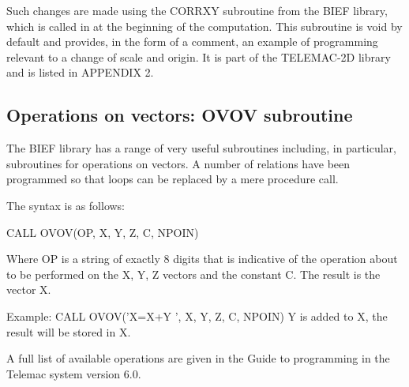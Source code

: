  Such changes are made using the CORRXY subroutine from the BIEF library, which is called in at the beginning of the computation. This subroutine is void by default and provides, in the form of a comment, an example of programming relevant to a change of scale and origin. It is part of the TELEMAC-2D library and is listed in APPENDIX 2.


\subsection{ Operations on vectors: OVOV subroutine }

 The BIEF library has a range of very useful subroutines including, in particular, subroutines for operations on vectors. A number of relations have been programmed so that loops can be replaced by a mere procedure call.

 The syntax is as follows:

 CALL OVOV(OP, X, Y, Z, C, NPOIN)

 Where OP is a string of exactly 8 digits that is indicative of the operation about to be performed on the X, Y, Z vectors and the constant C. The result is the vector X.

 Example:  CALL OVOV('X=X+Y ', X, Y, Z, C, NPOIN)  Y is added to X, the result will be stored in X.

 A full list of available operations are given in the Guide to programming in the Telemac system version 6.0.

